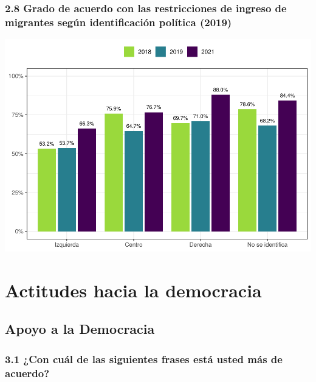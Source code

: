 \documentclass[
  12pt,
]{book}
\begin{document}
\hypertarget{grado-de-acuerdo-con-las-restricciones-de-ingreso-de-migrantes-seguxfan-identificaciuxf3n-poluxedtica-2019}{%
\subsection{2.8 Grado de acuerdo con las restricciones de ingreso de migrantes según identificación política (2019)}\label{grado-de-acuerdo-con-las-restricciones-de-ingreso-de-migrantes-seguxfan-identificaciuxf3n-poluxedtica-2019}}

\includegraphics{reporte-elsoc_files/figure-latex/unnamed-chunk-22-1.pdf}

\hypertarget{actitudes-hacia-la-democracia}{%
\chapter{Actitudes hacia la democracia}\label{actitudes-hacia-la-democracia}}

\hypertarget{apoyo-a-la-democracia}{%
\section{Apoyo a la Democracia}\label{apoyo-a-la-democracia}}

\hypertarget{con-cuuxe1l-de-las-siguientes-frases-estuxe1-usted-muxe1s-de-acuerdo}{%
\subsection{3.1 ¿Con cuál de las siguientes frases está usted más de acuerdo?}\label{con-cuuxe1l-de-las-siguientes-frases-estuxe1-usted-muxe1s-de-acuerdo}}
\end{document}
